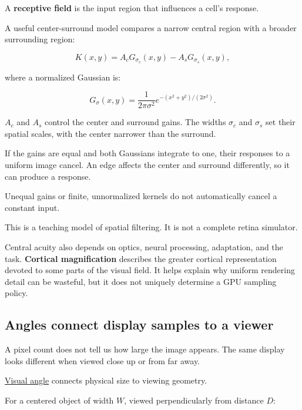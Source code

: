\hypertarget{04-visual-computing-ii-ch043-why-a-uniform-patch-and-an-edge-produce-different-responses}{}

A \textbf{receptive field} is the input region that influences a cell's response.

A useful center-surround model compares a narrow central region with a broader surrounding region:

\[
K(x,y)=A_cG_{\sigma_c}(x,y)-A_sG_{\sigma_s}(x,y),
\]

where a normalized Gaussian is:

\[
G_\sigma(x,y)=
\frac{1}{2\pi\sigma^2}
e^{-(x^2+y^2)/(2\sigma^2)}.
\]

\(A_c\) and \(A_s\) control the center and surround gains. The widths \(\sigma_c\) and \(\sigma_s\) set their spatial scales, with the center narrower than the surround.

If the gains are equal and both Gaussians integrate to one, their responses to a uniform image cancel. An edge affects the center and surround differently, so it can produce a response.

Unequal gains or finite, unnormalized kernels do not automatically cancel a constant input.

This is a teaching model of spatial filtering. It is not a complete retina simulator.

Central acuity also depends on optics, neural processing, adaptation, and the task. \textbf{Cortical magnification} describes the greater cortical representation devoted to some parts of the visual field. It helps explain why uniform rendering detail can be wasteful, but it does not uniquely determine a GPU sampling policy.

\subsection{Angles connect display samples to a viewer}\label{04-visual-computing-ii-ch043-angles-connect-display-samples-to-a-viewer}

\hypertarget{04-visual-computing-ii-ch043-angles-connect-display-samples-to-a-viewer}{}

A pixel count does not tell us how large the image appears. The same display looks different when viewed close up or from far away.

\hyperref[appendix-7d356c396d1a]{Visual angle} connects physical size to viewing geometry.

For a centered object of width \(W\), viewed perpendicularly from distance \(D\):

